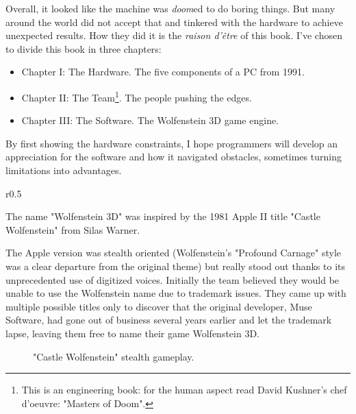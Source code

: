 Overall, it looked like the machine was \emph{doom}ed to do boring things. But many around the world did not accept that and tinkered with the hardware to achieve unexpected results. How they did it is the \textit{raison d'\^etre} of this book. I've chosen to divide this book in three chapters:
\begin{itemize}
\item Chapter I: The Hardware. The five components of a PC from 1991.
\item Chapter II: The Team\footnote{This is an engineering book: for the human aspect read David Kushner's chef d'oeuvre: "Masters of Doom".}. The people pushing the edges.
\item Chapter III: The Software. The Wolfenstein 3D game engine.
\end{itemize}
\par
By first showing the hardware constraints, I hope programmers will develop an appreciation for the software and how it navigated obstacles, sometimes turning limitations into advantages.\\
\pagebreak



\begin{wrapfigure}[12]{r}{0.5\textwidth}

\centering
{}
\end{wrapfigure}
  The name "Wolfenstein 3D" was inspired by the 1981 Apple II title "Castle Wolfenstein" from Silas Warner.\\
 \par The Apple version was stealth oriented (Wolfenstein's "Profound Carnage" style was a clear departure from the original theme) but really stood out thanks to its unprecedented use of digitized voices.
 Initially the team believed they would be unable to use the Wolfenstein name due to trademark issues. 
  They came up with multiple possible titles only to discover that the original developer, Muse Software, had gone out of business several years earlier and let the trademark lapse, leaving them free to name their game Wolfenstein 3D.\\
 \vspace{15pt}


\begin{figure}[H]
\centering
{}
\caption{"Castle Wolfenstein" stealth gameplay.}
\end{figure}


